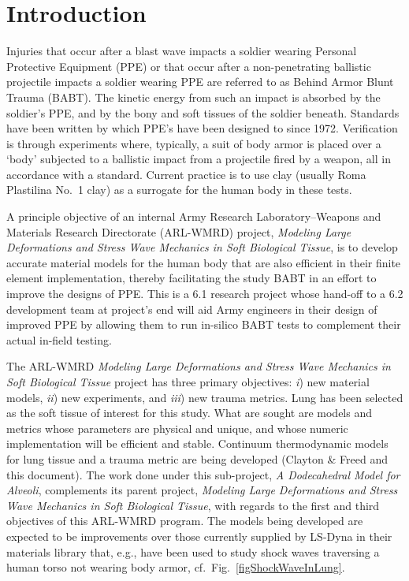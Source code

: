 \part{Introduction}
\label{partIntroduction}

Injuries that occur after a blast wave impacts a soldier wearing Personal Protective Equipment (PPE) or that occur after a non-penetrating ballistic projectile impacts a soldier wearing PPE are referred to as Behind Armor Blunt Trauma (BABT).  The kinetic energy from such an impact is absorbed by the soldier's PPE, and by the bony and soft tissues of the soldier beneath.  Standards have been written by which PPE's have been designed to since 1972.  Verification is through experiments where, typically, a suit of body armor is placed over a `body' subjected to a ballistic impact from a projectile fired by a weapon, all in accordance with a standard.  Current practice is to use clay (usually Roma Plastilina No.~1 clay) as a surrogate for the human body in these tests.  

A principle objective of an internal Army Research Laboratory--Weapons and Materials Research Directorate (ARL-WMRD) project, \textit{Modeling Large Deformations and Stress Wave Mechanics in Soft Biological Tissue}, is to develop accurate material models for the human body that are also efficient in their finite element implementation, thereby facilitating the study BABT in an effort to improve the designs of PPE.  This is a 6.1 research project whose hand-off to a 6.2 development team at project's end will aid Army engineers in their design of improved PPE by allowing them to run in-silico BABT tests to complement their actual in-field testing.

The ARL-WMRD \textit{Modeling Large Deformations and Stress Wave Mechanics in Soft Biological Tissue\/} project has three primary objectives: \textit{i\/}) new material models, \textit{ii\/}) new experiments, and \textit{iii\/}) new trauma metrics.  Lung has been selected as the soft tissue of interest for this study.  What are sought are models and metrics whose parameters are physical and unique, and whose numeric implementation will be efficient and stable.  Continuum thermo\-dynamic models for lung tissue and a trauma metric are being developed (Clayton \& Freed \cite{ClaytonFreed19,ClaytonFreed20} and this document).  The work done under this sub-project, \textit{A Dodecahedral Model for Alveoli}, complements its parent project, \textit{Modeling Large Deformations and Stress Wave Mechanics in Soft Biological Tissue}, with regards to the first and third objectives of this ARL-WMRD program.  The models being developed are expected to be improvements over those currently supplied by LS-Dyna in their materials library that, e.g., have been used to study shock waves traversing a human torso not wearing body armor, cf.\ Fig.~\ref{figShockWaveInLung}.

